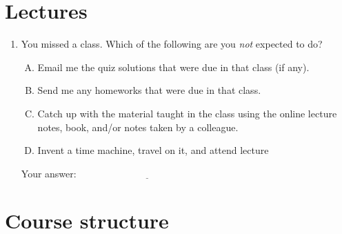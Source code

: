 \documentclass[10pt]{amsart}
\begin{document}
\section{Lectures}

\begin{enumerate}
\item You missed a class. Which of the following are you {\em not}
  expected to do?

  \begin{enumerate}[(A)]
  \item Email me the quiz solutions that were due in that class (if any).
  \item Send me any homeworks that were due in that class.
  \item Catch up with the material taught in the class using the
    online lecture notes, book, and/or notes taken by a colleague.
  \item Invent a time machine, travel on it, and attend lecture
  \end{enumerate}

  \vspace{0.1in}
  Your answer: $\underline{\qquad\qquad\qquad\qquad\qquad\qquad\qquad}$
  \vspace{0.1in}

\end{enumerate}

\section{Course structure}
\end{document}
